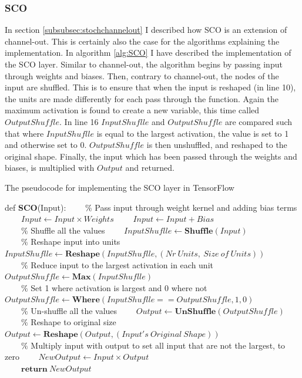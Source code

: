 \subsubsection*{SCO}
In section \ref{subsubsec:stochchannelout} I described how \ac{SCO} is an extension of channel-out. This is certainly
also the case for the algorithms explaining the implementation. In algorithm \ref{alg:SCO} I have described the
implementation of the \ac{SCO} layer. Similar to channel-out, the algorithm begins by 
passing input through weights and biases. Then, contrary to channel-out, the nodes of the input are shuffled. This 
is to ensure that when the input is reshaped (in line 10), the units are made differently for each pass through 
the function. Again the maximum activation is found to create a new variable, this time called $OutputShuffle$. 
In line 16 $InputShuflle$ and $OutputShuffle$ are compared such that where $InputShuflle$ is equal to the largest 
activation, the value is set to 1 and otherwise set to 0. $OutputShuffle$ is then unshuffled, and reshaped to the 
original shape. Finally, the input which has been passed through the weights and biases, is multiplied with 
$Output$ and returned.
\begin{algorithm}
    \caption{The pseudocode for implementing the SCO layer in TensorFlow}\label{alg:SCO}
    \begin{algorithmic}[1]
    \State def \textbf{SCO}(Input): 
    \State \ \ \ \ $\%$ Pass input through weight kernel and adding bias terms
    \State \ \ \ \ $Input \gets Input \times Weights$
    \State \ \ \ \ $Input \gets Input + Bias$
    \\
    \State \ \ \ \ $\%$ Shuffle all the values
    \State \ \ \ \ $InputShuflle \gets \textbf{Shuffle}(Input)$
    \\
    \State \ \ \ \ $\%$ Reshape input into units
    \State \ \ \ \ $InputShuflle \gets \textbf{Reshape}(InputShuflle,(Nr\ Units,\ Size \ of \ Units))$
    \\
    \State \ \ \ \ $\%$ Reduce input to the largest activation in each unit
    \State \ \ \ \ $OutputShuffle \gets \textbf{Max}(InputShuflle)$
    \\
    \State \ \ \ \ $\%$ Set 1 where activation is largest and 0 where not
    \State \ \ \ \ $OutputShuffle \gets \textbf{Where}(InputShuflle == OutputShuffle, 1,0)$
    \\
    \State \ \ \ \ $\%$ Un-shuffle all the values
    \State \ \ \ \ $Output \gets \textbf{UnShuffle}(OutputShuffle)$
    \\
    \State \ \ \ \ $\%$ Reshape to original size
    \State \ \ \ \ $Output \gets \textbf{Reshape}(Output,(Input's \ Original \ Shape))$
    \\
    \State \ \ \ \ $\%$ Multiply input with output to set all input that are not the largest, to zero
    \State \ \ \ \ $NewOutput \gets Input \times Output$
    \\
    \State \ \ \ \ $\textbf{return}\ NewOutput$
    \end{algorithmic}
\end{algorithm}
